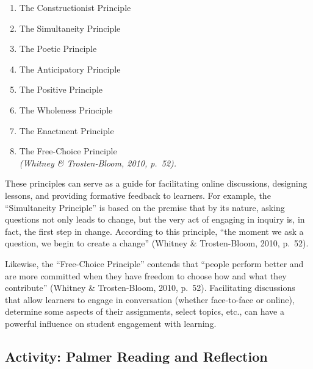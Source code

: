\documentclass[
]{book}
\providecommand{\tightlist}{%
  \setlength{\itemsep}{0pt}\setlength{\parskip}{0pt}}
\begin{document}
\begin{enumerate}
\def\labelenumi{\arabic{enumi}.}
\tightlist
\item
  The Constructionist Principle\\
\item
  The Simultaneity Principle\\
\item
  The Poetic Principle\\
\item
  The Anticipatory Principle\\
\item
  The Positive Principle\\
\item
  The Wholeness Principle\\
\item
  The Enactment Principle\\
\item
  The Free-Choice Principle\\
  \emph{(Whitney \& Trosten-Bloom, 2010, p.~52).}
\end{enumerate}

These principles can serve as a guide for facilitating online discussions, designing lessons, and providing formative feedback to learners. For example, the ``Simultaneity Principle'' is based on the premise that by its nature, asking questions not only leads to change, but the very act of engaging in inquiry is, in fact, the first step in change. According to this principle, ``the moment we ask a question, we begin to create a change'' (Whitney \& Trosten-Bloom, 2010, p.~52).

Likewise, the ``Free-Choice Principle'' contends that ``people perform better and are more committed when they have freedom to choose how and what they contribute'' (Whitney \& Trosten-Bloom, 2010, p.~52). Facilitating discussions that allow learners to engage in conversation (whether face-to-face or online), determine some aspects of their assignments, select topics, etc., can have a powerful influence on student engagement with learning.

\hypertarget{activity-palmer-reading-and-reflection-2}{%
\subsection{Activity: Palmer Reading and Reflection}\label{activity-palmer-reading-and-reflection-2}}
\end{document}
